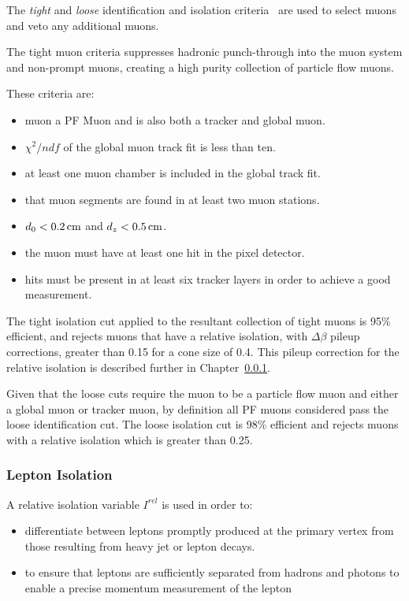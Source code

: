 The \emph{tight} and \emph{loose} identification and isolation criteria~\cite{Chatrchyan:2012xi} are used to select muons and veto any additional muons.

The tight muon criteria suppresses hadronic punch-through into the muon system and non-prompt muons, creating a high purity collection of particle flow muons.

These criteria are:
\begin{itemize}
\item muon a PF Muon and is also both a tracker and global muon.
\item $\chi^{2}/ndf$ of the global muon track fit is less than ten. 
\item at least one muon chamber is included in the global track fit.
\item that muon segments are found in at least two muon stations.
\item $d_{0} < 0.2\,\text{cm}$ and $d_{z} < 0.5\,\text{cm}$.
\item the muon must have at least one hit in the pixel detector.
\item hits must be present in at least six tracker layers in order to achieve a good \pT measurement.
\end{itemize}

The tight isolation cut applied to the resultant collection of tight muons is 95\% efficient, and rejects muons that have a relative isolation, with $\Delta\beta$ pileup corrections, greater than 0.15 for a cone size of 0.4.
This pileup correction for the relative isolation is described further in Chapter~\ref{subsubsec:relIso}.

Given that the loose cuts require the muon to be a particle flow muon and either a global muon or tracker muon, by definition all PF muons considered pass the loose identification cut.
The loose isolation cut is 98\% efficient and rejects muons with a relative isolation which is greater than 0.25.

\subsubsection{Lepton Isolation}\label{subsubsec:relIso}
A relative isolation variable $I^{rel}$ is used in order to:
\begin{itemize}
\item differentiate between leptons promptly produced at the primary vertex from those resulting from heavy jet or lepton decays.
\item to ensure that leptons are sufficiently separated from hadrons and photons to enable a precise momentum measurement of the lepton 
\end{itemize}

